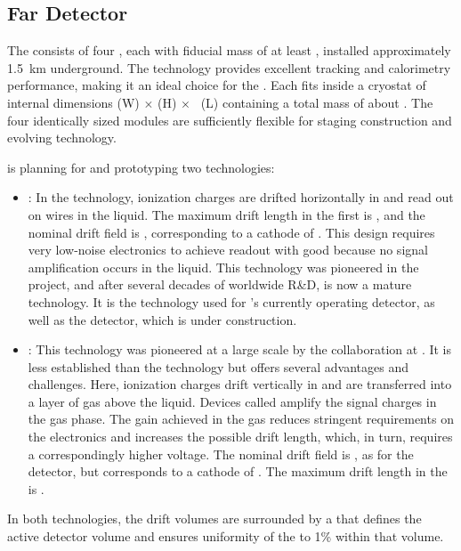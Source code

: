 
\subsection{Far Detector}
\label{ch:dune-det-tech-ov-fd}

The \fdfiducialmass {}  consists of four  , each with fiducial mass of at least \nominalmodsize, installed approximately \SI{1.5}{km} underground. The  technology provides
excellent tracking and calorimetry performance, making it an ideal
choice for the  . Each  fits inside a cryostat of internal dimensions
\cryostatwdth (W) $\times$ \cryostatht (H) $\times$ \cryostatlen~(L) containing a total  mass of about \larmass{}.
 The four identically sized modules are sufficiently flexible for staging construction and  evolving  technology.

 is planning for and prototyping two  technologies:
\begin{itemize}
\item {}: In the  technology, ionization charges are drifted horizontally in  and read out on wires in the liquid.  The maximum drift length in the first   is \spmaxdrift, and the nominal drift field is \spmaxfield, corresponding to a cathode  of \sptargetdriftvoltpos. This design requires very low-noise electronics to achieve readout with good  because no signal amplification occurs in the liquid. This technology was pioneered in the  project, and after several decades of worldwide R\&D, is now a mature technology. It is the technology used for 's currently operating  detector, as well as the  detector, which is under construction. 

\item {}: This technology was pioneered at a large scale by the  collaboration at . It is less established than the  technology but offers several advantages and challenges. Here, ionization charges drift vertically in  and are transferred into a layer of gas above the liquid. Devices called  amplify the signal charges  in the gas phase. The gain achieved in the gas reduces stringent requirements on the electronics and increases the possible drift length, which, in turn, requires a correspondingly higher voltage. The nominal drift field is \dpnominaldriftfield, as for the  detector, but corresponds to a cathode  of \dptargetdriftvoltpos.
The maximum drift length in the  is \dpmaxdrift{}.  
\end{itemize}
In both technologies, the drift volumes are surrounded by a  that defines the active detector volume and ensures uniformity of the \efield to 1\% within that volume.

